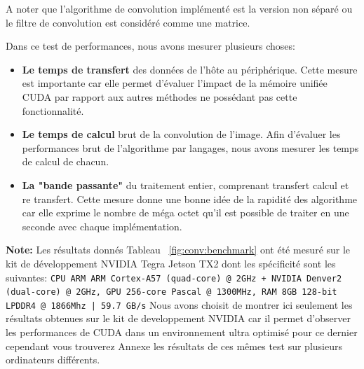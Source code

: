 A noter que l'algorithme de convolution implémenté est la version non séparé ou le filtre de convolution est considéré comme une matrice.

Dans ce test de performances, nous avons mesurer plusieurs choses:
\begin{itemize}
\item \textbf{Le temps de transfert} des données de l'hôte au périphérique. Cette mesure est importante car elle permet d'évaluer l'impact de la mémoire unifiée CUDA par rapport aux autres méthodes ne possédant pas cette fonctionnalité.
\item \textbf{Le temps de calcul} brut de la convolution de l'image. Afin d'évaluer les performances brut de l'algorithme par langages, nous avons mesurer les temps de calcul de chacun.
\item \textbf{La "bande passante"} du traitement entier, comprenant transfert calcul et re transfert. Cette mesure donne une bonne idée de la rapidité des algorithme car elle exprime le nombre de méga octet qu'il est possible de traiter en une seconde avec chaque implémentation.
\end{itemize}

\textbf{Note:} Les résultats donnés Tableau ~\ref{fig:conv:benchmark} ont été mesuré sur le kit de développement NVIDIA Tegra Jetson TX2 dont les spécificité sont les suivantes: \texttt{CPU ARM ARM Cortex-A57 (quad-core) @ 2GHz + NVIDIA Denver2 (dual-core) @ 2GHz, GPU 256-core Pascal @ 1300MHz, RAM 8GB 128-bit LPDDR4 @ 1866Mhz |  59.7 GB/s} Nous avons choisit de montrer ici seulement les résultats obtenues sur le kit de developpement NVIDIA car il permet d'observer les performances de CUDA dans un environnement ultra optimisé pour ce dernier cependant vous trouverez Annexe %
les résultats de ces mêmes test sur plusieurs ordinateurs différents.

